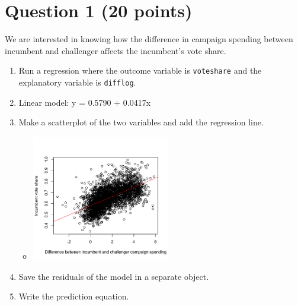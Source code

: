 \documentclass[12pt,letterpaper]{article}
\begin{document}
\section*{Question 1 (20 points)}
\vspace{.25cm}
\noindent We are interested in knowing how the difference in campaign spending between incumbent and challenger affects the incumbent's vote share. 
	\begin{enumerate}
		\item Run a regression where the outcome variable is \texttt{voteshare} and the explanatory variable is \texttt{difflog}.	
		\item[] Linear model: y = 0.5790 + 0.0417x
		
		\vspace{1cm}
		\item Make a scatterplot of the two variables and add the regression line. 
		\begin{itemize}
			\item []
		\includegraphics[width=0.5\textwidth]{Rplot.png}
		\end{itemize}
		
		\vspace{1cm}
		\item Save the residuals of the model in a separate object.	\vspace{1cm}
		
		\item Write the prediction equation.
	\end{enumerate}
	
\newpage
\end{document}
